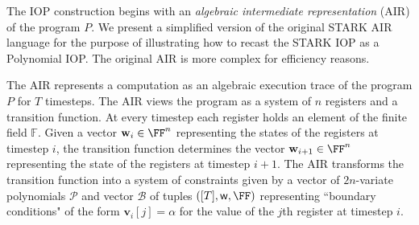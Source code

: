 The IOP construction begins with an \emph{algebraic intermediate representation} (AIR) of the program $P$.  
We present a simplified version of the original \textsf{STARK} AIR language for the purpose of illustrating how to recast the \textsf{STARK} IOP as a Polynomial IOP.  %
The original AIR is more complex for efficiency reasons.

The AIR represents a computation as an algebraic execution trace of the program $P$ for $T$ timesteps. The AIR views the program as a system of $n$ registers and a transition function. At every timestep each register holds an element of the finite field $\mathbb{F}$. Given a vector $\mathbf{w}_i \in \FF^n$ representing the states of the registers at timestep $i$, the transition function determines the vector $\mathbf{w}_{i+1} \in \FF^n$ representing the state of the registers at timestep $i+1$. The AIR transforms the transition function into a system of constraints given by a vector of $2n$-variate polynomials $\boldsymbol{\mathcal{P}}$ and vector $\boldsymbol{\mathcal{B}}$ of tuples $([T], \mathsf{w}, \FF)$ representing ``boundary conditions" of the form $\boldsymbol{v}_i[j] = \alpha$ for the value of the $j$th register at timestep $i$.  



